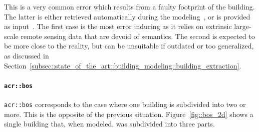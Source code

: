                 This is a very common error which results from a faulty footprint of the building.
                The latter is either retrieved automatically during the modeling~\parencite{lafarge2012creating}, or is provided as input~\parencite{durupt2006automatic}.
                The first case is the most error inducing as it relies on extrinsic large-scale remote sensing data that are devoid of semantics.
                The second is expected to be more close to the reality, but can be unsuitable if outdated or too generalized, as discussed in Section~\ref{subsec::state_of_the_art::building_modeling::building_extraction}.

            \paragraph{\texttt{\acrlong*{acr::bos}}}
                \texttt{\gls{acr::bos}} corresponds to the case where one building is subdivided into two or more.
                This is the opposite of the previous situation.
                Figure~\ref{fig::bos_2d} shows a single building that, when modeled, was subdivided into three parts.\\

                \begin{figure}[htbp]
                    \centering
                \end{figure}

